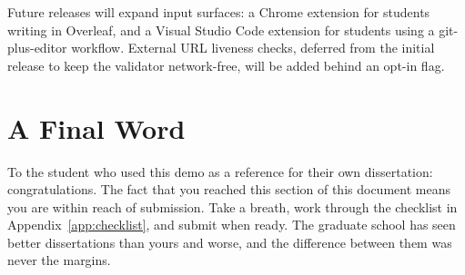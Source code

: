 Future releases will expand input surfaces: a Chrome extension for
students writing in Overleaf, and a Visual Studio Code extension for
students using a git-plus-editor workflow. External URL liveness
checks, deferred from the initial release to keep the validator
network-free, will be added behind an opt-in flag.

\section{A Final Word}

To the student who used this demo as a reference for their own
dissertation: congratulations. The fact that you reached this section
of this document means you are within reach of submission. Take a
breath, work through the checklist in Appendix~\ref{app:checklist},
and submit when ready. The graduate school has seen better
dissertations than yours and worse, and the difference between them
was never the margins.
